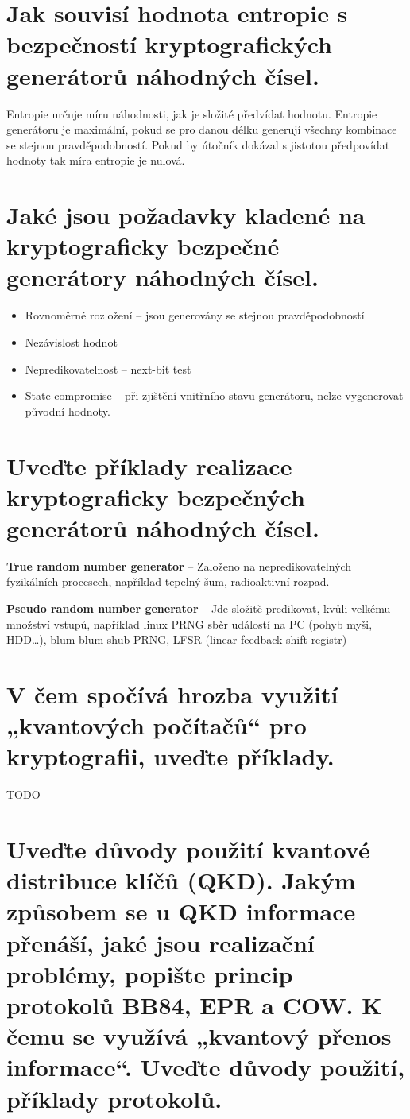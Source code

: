 \section{Jak souvisí hodnota entropie s bezpečností kryptografických generátorů náhodných čísel.}

Entropie určuje míru náhodnosti, jak je složité předvídat hodnotu. Entropie generátoru je maximální, pokud se pro danou délku generují všechny kombinace se stejnou pravděpodobností. Pokud by útočník dokázal s jistotou předpovídat hodnoty tak míra entropie je nulová.

\section{Jaké jsou požadavky kladené na kryptograficky bezpečné generátory náhodných čísel.}

\begin{itemize}
    \item Rovnoměrné rozložení -- jsou generovány se stejnou pravděpodobností
    \item Nezávislost hodnot
    \item Nepredikovatelnost -- next-bit test
    \item State compromise -- při zjištění vnitřního stavu generátoru, nelze vygenerovat původní hodnoty.
\end{itemize}

\section{Uveďte příklady realizace kryptograficky bezpečných generátorů náhodných čísel.}

\textbf{True random number generator} -- Založeno na nepredikovatelných fyzikálních procesech, například tepelný šum, radioaktivní rozpad.

\textbf{Pseudo random number generator} -- Jde složitě predikovat, kvůli velkému množství vstupů, například linux PRNG sběr událostí na PC (pohyb myši, HDD\dots), blum-blum-shub PRNG, LFSR (linear feedback shift registr)

\section{V čem spočívá hrozba využití „kvantových počítačů“ pro kryptografii, uveďte příklady.}

TODO

\section{Uveďte důvody použití kvantové distribuce klíčů (QKD). Jakým způsobem se u QKD informace přenáší, jaké jsou realizační problémy, popište princip protokolů BB84, EPR a COW. K čemu se využívá „kvantový přenos informace“. Uveďte důvody použití, příklady protokolů.}

